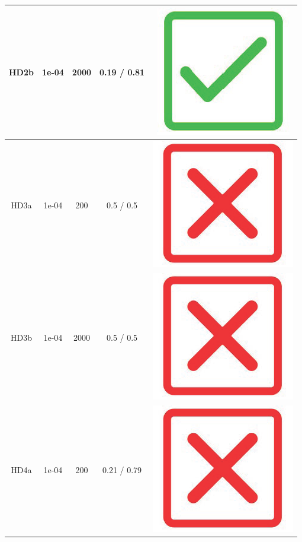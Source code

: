 \begin{table}[!h]
{\begin{tabular}[t]{ccccc}
\midrule
HD2b & 1e-04 & 2000 & 0.19 / 0.81 & \includegraphics[scale=0.05]{figs/green_tick.png}\\
\midrule
HD3a & 1e-04 & 200 & 0.5 / 0.5 & \includegraphics[scale=0.05]{figs/red_cross.png}\\
\midrule
\addlinespace
HD3b & 1e-04 & 2000 & 0.5 / 0.5 & \includegraphics[scale=0.05]{figs/red_cross.png}\\
\midrule
HD4a & 1e-04 & 200 & 0.21 / 0.79 & \includegraphics[scale=0.05]{figs/red_cross.png}\\

\end{tabular}}
\end{table}
